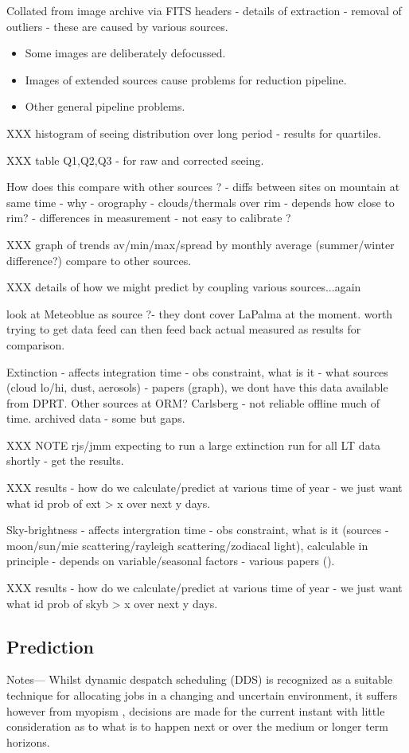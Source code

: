 Collated from image archive via FITS headers - details of extraction - removal of outliers - these are caused by various sources.
\begin{itemize}
\item Some images are deliberately defocussed.
\item Images of extended sources cause problems for reduction pipeline.
\item Other general pipeline problems.
\end{itemize}


XXX histogram of seeing distribution over long period - results for quartiles.

XXX table Q1,Q2,Q3 - for raw and corrected seeing. 


How does this compare with other sources ? - diffs between sites on mountain at same time - why - orography - clouds/thermals over rim - depends how close to rim? - differences in measurement - not easy to calibrate ?

XXX graph of trends av/min/max/spread by monthly average (summer/winter difference?)
compare to other sources.

XXX details of how we might predict by coupling various sources...again

look at Meteoblue as source ?- they dont cover LaPalma at the moment.
 worth trying to get data feed can then feed back actual measured as results for comparison.

Extinction - affects integration time - obs constraint, what is it - what sources (cloud lo/hi, dust, aerosols) - papers (graph), we dont have this data available from DPRT. Other sources at ORM? Carlsberg - not reliable offline much of time. archived data - some but gaps. 

XXX NOTE rjs/jmm expecting to run a large extinction run for all LT data shortly - get the results.

XXX results -  how do we calculate/predict at various time of year - we just want what id prob of ext > x over next y days.

Sky-brightness - affects intergration time - obs constraint, what is it (sources -moon/sun/mie scattering/rayleigh scattering/zodiacal light), calculable in principle - depends on variable/seasonal factors - various papers ().

XXX results - how do we calculate/predict at various time of year - we just want what id prob of skyb > x over next y days.

\subsection{Prediction }
Notes---
Whilst dynamic despatch scheduling (DDS) is recognized as a suitable technique \cite{xxx} for allocating jobs in a changing and uncertain environment, it suffers however from myopism \cite{xxx}, decisions are made for the current instant with little consideration as to what is to happen next or over the medium or longer term horizons. 

